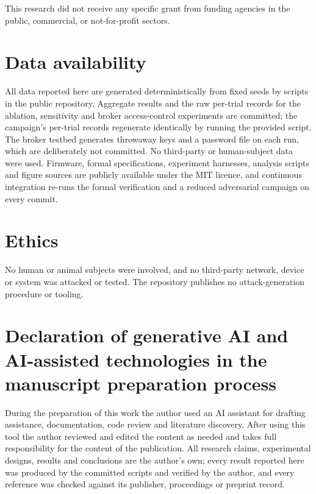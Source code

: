 \noindent This research did not receive any specific grant from funding agencies in the public,
commercial, or not-for-profit sectors.

\section*{Data availability}

\noindent All data reported here are generated deterministically from fixed seeds by scripts in
the public repository. Aggregate results and the raw per-trial records for the ablation,
sensitivity and broker access-control experiments are committed; the campaign's per-trial
records regenerate identically by running the provided script. The broker testbed generates
throwaway keys and a password file on each run, which are deliberately not committed. No
third-party or human-subject data were used. Firmware, formal specifications, experiment
harnesses, analysis scripts and figure sources are publicly available under the MIT licence,
and continuous integration re-runs the formal verification and a reduced adversarial campaign
on every commit.

\section*{Ethics}

\noindent No human or animal subjects were involved, and no third-party network, device or
system was attacked or tested. The repository publishes no attack-generation procedure or
tooling.

\section*{Declaration of generative AI and AI-assisted technologies in the manuscript
preparation process}

\noindent During the preparation of this work the author used an AI assistant for drafting
assistance, documentation, code review and literature discovery. After using this tool the
author reviewed and edited the content as needed and takes full responsibility for the content
of the publication. All research claims, experimental designs, results and conclusions are the
author's own; every result reported here was produced by the committed scripts and verified by
the author, and every reference was checked against its publisher, proceedings or preprint
record.

